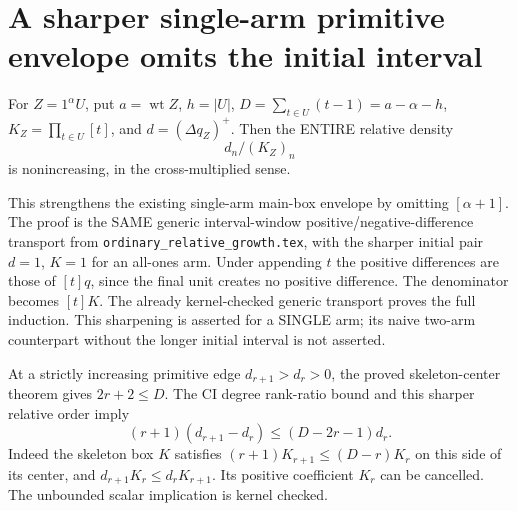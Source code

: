 \section{A sharper single-arm primitive envelope omits the initial interval}
For $Z=1^\alpha U$, put $a=\operatorname{wt}Z$, $h=|U|$,
$D=\sum_{t\in U}(t-1)=a-\alpha-h$, $K_Z=\prod_{t\in U}[t]$, and
$d=(\Delta q_Z)^+$. Then the ENTIRE relative density
\[
                              d_n/(K_Z)_n
\]
is nonincreasing, in the cross-multiplied sense.

This strengthens the existing single-arm main-box envelope by
omitting $[\alpha+1]$. The proof is the SAME generic interval-window
positive/negative-difference transport from
\texttt{ordinary\_relative\_growth.tex}, with the sharper initial
pair $d=1$, $K=1$ for an all-ones arm. Under appending $t$ the
positive differences are those of $[t]q$, since the final unit
creates no positive difference. The denominator becomes $[t]K$.
The already kernel-checked generic transport proves the full induction.
This sharpening is asserted for a SINGLE arm; its naive two-arm
counterpart without the longer initial interval is not asserted.

At a strictly increasing primitive edge $d_{r+1}>d_r>0$, the
proved skeleton-center theorem gives $2r+2\le D$. The CI degree
rank-ratio bound and this sharper relative order imply
\[
 (r+1)(d_{r+1}-d_r)\le(D-2r-1)d_r.                    \tag{1}
\]
Indeed the skeleton box $K$ satisfies
$(r+1)K_{r+1}\le(D-r)K_r$ on this side of its center, and
$d_{r+1}K_r\le d_rK_{r+1}$. Its positive coefficient $K_r$
can be cancelled. The unbounded scalar implication is kernel checked.

